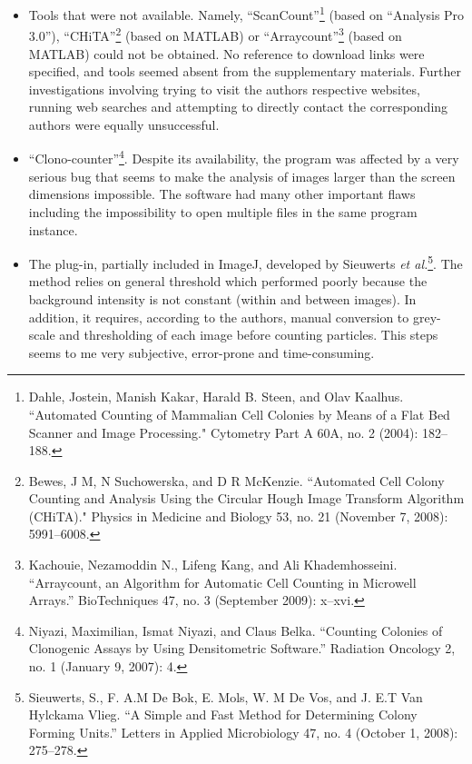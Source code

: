 \documentclass{letter}
\begin{document}
\begin{letter}{}
\begin{itemize}
   \item Tools that were not available. Namely, ``ScanCount''\footnote{Dahle,
   Jostein, Manish Kakar, Harald B. Steen, and Olav Kaalhus. ``Automated
   Counting of Mammalian Cell Colonies by Means of a Flat Bed Scanner and Image
   Processing." Cytometry Part A 60A, no. 2 (2004): 182–188.}
  (based on ``Analysis Pro 3.0''),
 ``CHiTA''\footnote{Bewes, J M, N Suchowerska, and D R McKenzie. ``Automated
 Cell Colony Counting and Analysis Using the Circular Hough Image Transform
 Algorithm (CHiTA)." Physics in Medicine and Biology 53, no. 21 (November 7,
 2008): 5991–6008.} (based on MATLAB) or ``Arraycount''\footnote{Kachouie,
 Nezamoddin N., Lifeng Kang, and Ali Khademhosseini. ``Arraycount, an Algorithm
 for Automatic Cell Counting in Microwell Arrays.'' BioTechniques 47, no. 3
 (September 2009): x–xvi.} (based on MATLAB) could not be obtained. No reference
 to download links were specified, and tools seemed absent from the supplementary
 materials.
 Further investigations involving trying to visit the authors respective
 websites, running web searches and  attempting to directly
 contact the corresponding authors were equally unsuccessful.
 
 \item ``Clono-counter''\footnote{Niyazi, Maximilian, Ismat Niyazi, and Claus Belka. ``Counting Colonies of Clonogenic Assays by Using Densitometric Software.'' Radiation Oncology 2, no. 1 (January 9, 2007): 4.}.
 Despite its availability, the program was affected by a very
 serious bug that seems to make the analysis of images larger than the screen
 dimensions impossible.
 The software had many other important flaws including the impossibility to open multiple
 files in the same program instance.
    
 \item The plug-in, partially included in ImageJ, developed by Sieuwerts \emph{et al.}\footnote{Sieuwerts, S., F. A.M De Bok, E. Mols, W. M De Vos, and J. E.T Van Hylckama Vlieg. ``A Simple and Fast Method for Determining Colony Forming Units.'' Letters in Applied Microbiology 47, no. 4 (October 1, 2008): 275–278.}.
 The method relies on general threshold which performed
 poorly because the background intensity is not constant (within and between
 images). In addition, it requires, according to the authors, manual conversion to grey-scale and thresholding of each image before counting particles.
 This steps seems to me very subjective, error-prone and time-consuming.
 

\end{itemize}
\end{letter}
\end{document}
